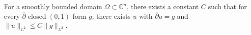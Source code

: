 
For a smoothly bounded domain $\Omega \subset \mathbb{C}^n$, there exists a constant $C$ such that for every $\bar{\partial}$-closed $(0,1)$-form $g$, there exists $u$ with $\bar{\partial}u = g$ and $\|u\|_{L^2} \leq C\|g\|_{L^2}$.
